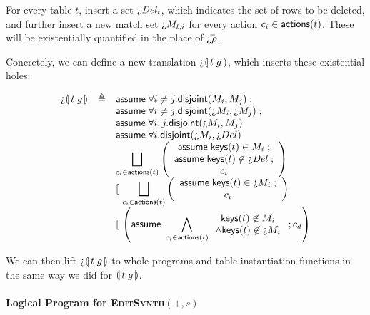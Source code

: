 For every table $t$, insert a set $\hole{\mathit{Del}_t}$, which indicates the
set of rows to be deleted, and further insert a new match set $\hole{M_{t,i}}$
for every action $c_i \in \mathsf{actions}(t)$. These will be existentially quantified in
the place of $\vec{\hole{\rho}}$.

Concretely, we can define a new translation $\hole{}\parenbb{t\; g}$,
which inserts these existential holes:

\[\begin{array}{lcl}
    \hole\parenbb{t\; g}
    & \triangleq
    & \assume{\forall i\neq j. \textsf{disjoint}(M_i,M_j)}; \\
    && \assume{\forall i\neq j. \textsf{disjoint}(\hole M_i,\hole M_j)};\\
    && \assume{\forall i,j. \textsf{disjoint}(\hole M_i, M_j)} \\
    && \assume{\forall i. \textsf{disjoint}(\hole M_i, \hole{Del})} \\
    && \displaystyle \Angel_{c_i \in \actions t}
       \left(\begin{array}{c}
         \assume{\keys t \in M_i}; \\
         \assume{\keys t \not\in \hole{\mathit{Del}}};\\
         c_i \\
       \end{array}\right)\\
    && \angel \displaystyle \Angel_{c_i \in \actions t}
       \left(\begin{array}{c}
               \assume{\keys t \in \hole{M_i}}; \\
               c_i \\
             \end{array}\right)\\
    && \displaystyle \angel \left(\assume{\bigwedge_{c_i \in \actions t}
       \begin{array}{c}
         \keys t \not\in M_i\\
         \wedge \keys t \not\in \hole M_i
       \end{array}}; c_d\right)
\end{array}\]


We can then lift $\hole\parenbb{t\; g}$ to whole programs and table
instantiation functions in the same way we did for $\llparenthesis\, t\; g\, \rrparenthesis$.



\paragraph{Logical Program for \textsc{EditSynth}$(+,s)$}

